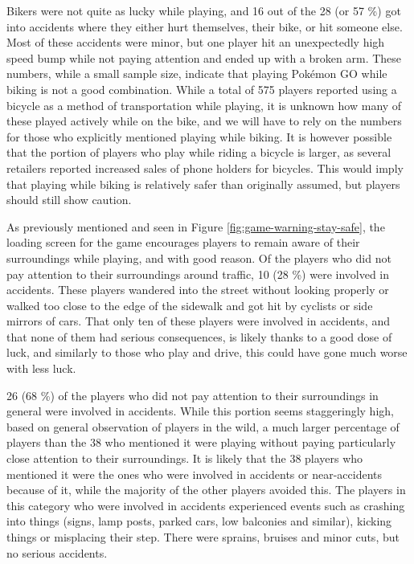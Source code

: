 Bikers were not quite as lucky while playing, and 16 out of the 28 (or 57 \%) got into accidents where they either hurt themselves, their bike, or hit someone else. Most of these accidents were minor, but one player hit an unexpectedly high speed bump while not paying attention and ended up with a broken arm. These numbers, while a small sample size, indicate that playing Pokémon GO while biking is not a good combination. While a total of 575 players reported using a bicycle as a method of transportation while playing, it is unknown how many of these played actively while on the bike, and we will have to rely on the numbers for those who explicitly mentioned playing while biking. It is however possible that the portion of players who play while riding a bicycle is larger, as several retailers reported increased sales of phone holders for bicycles. This would imply that playing while biking is relatively safer than originally assumed, but players should still show caution.

As previously mentioned and seen in Figure \ref{fig:game-warning-stay-safe}, the loading screen for the game encourages players to remain aware of their surroundings while playing, and with good reason. Of the players who did not pay attention to their surroundings around traffic, 10 (28 \%) were involved in accidents. These players wandered into the street without looking properly or walked too close to the edge of the sidewalk and got hit by cyclists or side mirrors of cars. That only ten of these players were involved in accidents, and that none of them had serious consequences, is likely thanks to a good dose of luck, and similarly to those who play and drive, this could have gone much worse with less luck.

26 (68 \%) of the players who did not pay attention to their surroundings in general were involved in accidents. While this portion seems staggeringly high, based on general observation of players in the wild, a much larger percentage of players than the 38 who mentioned it were playing without paying particularly close attention to their surroundings. It is likely that the 38 players who mentioned it were the ones who were involved in accidents or near-accidents because of it, while the majority of the other players avoided this. The players in this category who were involved in accidents experienced events such as crashing into things (signs, lamp posts, parked cars, low balconies and similar), kicking things or misplacing their step. There were sprains, bruises and minor cuts, but no serious accidents.

